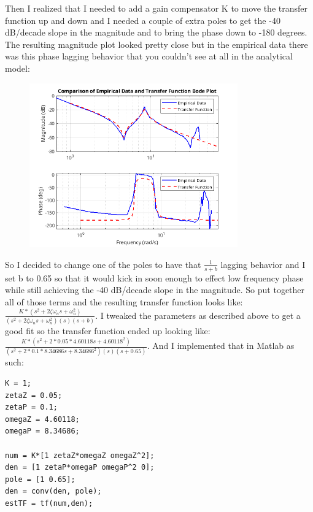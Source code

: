 \documentclass{article}
\begin{document}
Then I realized that I needed to add a gain compensator K to move the transfer function up and down and I needed a couple of extra poles to get the -40 dB/decade slope in the magnitude and to bring the phase down to -180 degrees.
The resulting magnitude plot looked pretty close but in the empirical data there was this phase lagging behavior that you couldn't see at all in the analytical model:

\begin{figure}[H]
    \centering
    \includegraphics[width=0.8\textwidth]{flatPhaseBode.png}
    \label{fig:flatPhaseBode}
\end{figure}

So I decided to change one of the poles to have that $\frac{1}{s+b}$ lagging behavior and I set b to 0.65 so that it would kick in soon enough to effect low frequency phase while still achieving the -40 dB/decade slope in the magnitude.
So put together all of those terms and the resulting transfer function looks like: $\frac{K*(s^2 + 2\zeta\omega_n s + \omega_n^2)}{(s^2 + 2\zeta\omega_n s + \omega_n^2)(s)(s+b)}$.
I tweaked the parameters as described above to get a good fit so the transfer function ended up looking like: $\frac{K*(s^2 + 2*0.05*4.60118 s + 4.60118^2)}{(s^2 + 2*0.1*8.34686 s + 8.34686^2)(s)(s+0.65)}$.
And I implemented that in Matlab as such:

\begin{lstlisting}[style=matlabstyle]
K = 1;
zetaZ = 0.05;
zetaP = 0.1;
omegaZ = 4.60118;
omegaP = 8.34686;

num = K*[1 zetaZ*omegaZ omegaZ^2];
den = [1 zetaP*omegaP omegaP^2 0];
pole = [1 0.65];
den = conv(den, pole);
estTF = tf(num,den);
\end{lstlisting}
\end{document}
